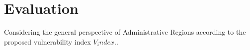 \documentclass[conference]{IEEEtran}
\begin{document}


\section{Evaluation}

Considering the general perspective of Administrative Regions according to the proposed vulnerability index $V_index.$.
\end{document}
